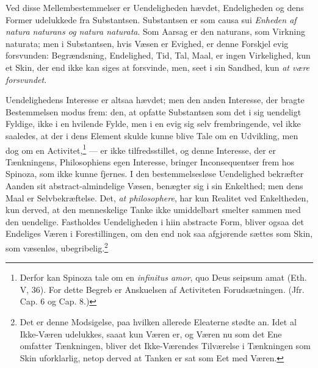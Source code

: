 \documentclass[12pt,a4paper]{book}
\newcommand{\opage}[1]{\marginnote{\footnotesize\textit{[#1]}}}
\begin{document}
Ved disse Mellembestemmelser er Uendeligheden hævdet, Endeligheden og
dens Former udelukkede fra Substantsen. Substantsen er som causa sui
\emph{Enheden af natura naturans og natura naturata}. Som Aarsag er
den naturans, som Virkning naturata; men i Substantsen, hvis Væsen er
Evighed, er denne Forskjel evig forsvunden: Begrændsning, Endelighed,
Tid, Tal, Maal, er ingen Virkelighed, kun et Skin, der end ikke kan
siges at forsvinde, men, seet i sin Sandhed, kun \emph{at være
forsvundet}.

Uendelighedens Interesse er altsaa hævdet; men den anden
Interesse, der bragte Bestemmelsen modus frem: den, at opfatte
Substantsen som det i sig uendeligt Fyldige, ikke i en hvilende Fylde,
men i en evig sig
selv frembringende, vel ikke saaledes, at der i dens Element skulde
kunne blive Tale om en Udvikling, men dog om en
Activitet,\footnote{Derfor kan Spinoza tale om en \emph{infinitus
amor}, quo Deus seipsum amat (Eth. V, 36). For dette Begreb er
Anskuelsen af Activiteten Forudsætningen. (Jfr. Cap. 6 og Cap. 8.)}
--- er ikke tilfredsstillet, og denne Interesse, der er
\opage{62} \setcounter{footnote}{0}%
Tænkningens, Philosophiens egen Interesse, bringer Inconsequentser
frem hos Spinoza, som ikke kunne fjernes. I den bestemmelsesløse
Uendelighed bekræfter Aanden sit abstract-almindelige Væsen, benægter
sig i sin Enkelthed; men dens Maal er Selvbekræftelse. Det, \emph{at
philosophere}, har kun Realitet ved Enkeltheden, kun derved, at
den menneskelige Tanke ikke umiddelbart smelter sammen med den
uendelige. Fastholdes Uendeligheden i hiin abstracte Form, bliver
ogsaa det Endeliges Væren i Forestillingen, om den end nok saa
afgjørende sættes som Skin, som væsenløs,
ubegribelig.\footnote{Det er denne Modsigelse, paa hvilken allerede
Eleaterne stødte an. Idet al Ikke-Væren udelukkes, saaat kun Væren er,
og Væren nu som det Ene omfatter Tænkningen, bliver det Ikke-Værendes
Tilværelse i Tænkningen som Skin uforklarlig, netop derved at Tanken
er sat som Eet med Væren.}
\end{document}
